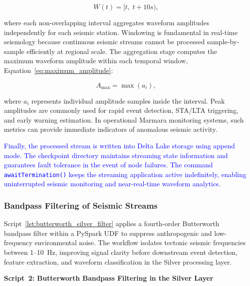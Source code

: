 \documentclass[data,article,submit,pdftex,moreauthors]{Definitions/mdpi}
\begin{document}
\begin{equation}
\label{eq:tumbling_window}
W(t)= [t,\; t+10s),
\end{equation}

where each non-overlapping interval aggregates waveform amplitudes independently for each seismic station. Windowing is fundamental in real-time seismology because continuous seismic streams cannot be processed sample-by-sample efficiently at regional scale. The aggregation stage computes the maximum waveform amplitude within each temporal window, Equation~\ref{eq:maximum_amplitude}:

\begin{equation}
\label{eq:maximum_amplitude}
A_{\max} = \max(a_i),
\end{equation}

where $a_i$ represents individual amplitude samples inside the interval. Peak amplitudes are commonly used for rapid event detection, STA/LTA triggering, and early warning estimation. In operational Marmara monitoring systems, such metrics can provide immediate indicators of anomalous seismic activity.

\textcolor{blue}{Finally, the processed stream is written into Delta Lake storage using append mode. The checkpoint directory maintains streaming state information and guarantees fault tolerance in the event of node failures. The command \texttt{awaitTermination()} keeps the streaming application active indefinitely, enabling uninterrupted seismic monitoring and near-real-time waveform analytics}.

\subsubsection{Bandpass Filtering of Seismic Streams}

Script~\ref{lst:butterworth_silver_filter} applies a fourth-order Butterworth bandpass filter within a PySpark UDF to suppress anthropogenic and low-frequency environmental noise. The workflow isolates tectonic seismic frequencies between 1--10~Hz, improving signal clarity before downstream event detection, feature extraction, and waveform classification in the Silver processing layer.

\textbf{Script~2: Butterworth Bandpass Filtering in the Silver Layer}
\end{document}
